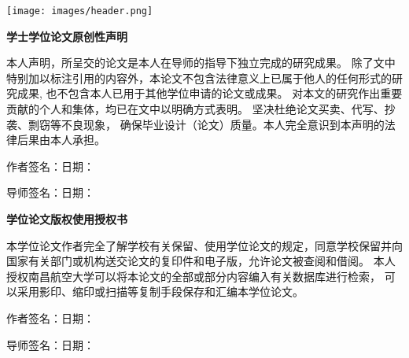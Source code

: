 %
%
%
%
%
%

\thispagestyle{empty}

\setlength{\parskip}{0.4em}
\renewcommand{\baselinestretch}{1.41}

\vspace*{-6mm}

\begin{center}
\texttt{[image: images/header.png]}
\end{center}
\vspace{-13mm}
\begin{center}
  \songti{}\textbf{学士学位论文原创性声明}
\end{center}


本人声明，所呈交的论文是本人在导师的指导下独立完成的研究成果。
除了文中特别加以标注引用的内容外，本论文不包含法律意义上已属于他人的任何形式的研究成果,
也不包含本人已用于其他学位申请的论文或成果。
对本文的研究作出重要贡献的个人和集体，均已在文中以明确方式表明。
坚决杜绝论文买卖、代写、抄袭、剽窃等不良现象，
确保毕业设计（论文）质量。本人完全意识到本声明的法律后果由本人承担。

\vspace*{1mm}

作者签名：\hspace{40mm}日\hspace{2.5mm}期：

\vspace*{1mm}
导师签名：\hspace{40mm}日\hspace{2.5mm}期：


\vspace{17mm}

\begin{center}
  \songti{}\textbf{学位论文版权使用授权书}
\end{center}

本学位论文作者完全了解学校有关保留、使用学位论文的规定，同意学校保留并向
国家有关部门或机构送交论文的复印件和电子版，允许论文被查阅和借阅。
本人授权南昌航空大学可以将本论文的全部或部分内容编入有关数据库进行检索，
可以采用影印、缩印或扫描等复制手段保存和汇编本学位论文。
\vspace*{1mm}

作者签名：\hspace{40mm}日\hspace{2.5mm}期：

\vspace*{1mm}
导师签名：\hspace{40mm}日\hspace{2.5mm}期：

\newpage
